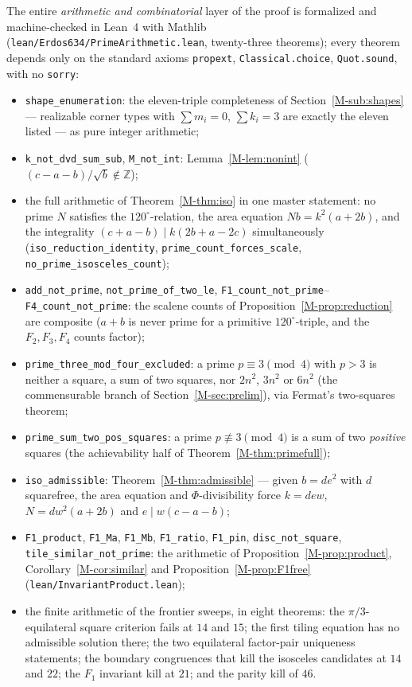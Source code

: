 \documentclass[11pt,reqno]{amsart}
\theoremstyle{plain}
\theoremstyle{definition}
\newcommand{\Z}{\mathbb{Z}}
\begin{document}
The entire \emph{arithmetic and combinatorial} layer of the proof is formalized and machine-checked
in Lean~4 with Mathlib (\texttt{lean/Erdos634/PrimeArithmetic.lean}, twenty-three theorems); every theorem depends only
on the standard axioms \texttt{propext}, \texttt{Classical.choice}, \texttt{Quot.sound}, with no
\texttt{sorry}:
\begin{itemize}
\item[] \texttt{shape\_enumeration}: the eleven-triple completeness of Section~\ref{M-sub:shapes} ---
realizable corner types with $\sum m_i=0$, $\sum k_i=3$ are exactly the eleven listed --- as pure
integer arithmetic;
\item[] \texttt{k\_not\_dvd\_sum\_sub}, \texttt{M\_not\_int}: Lemma~\ref{M-lem:nonint}
($(c-a-b)/\sqrt b\notin\Z$);
\item[] the full arithmetic of Theorem~\ref{M-thm:iso} in one master statement: no prime $N$
satisfies the $120^\circ$-relation, the area equation $Nb=k^2(a+2b)$, and the integrality
$(c+a-b)\mid k(2b+a-2c)$ simultaneously (\texttt{iso\_reduction\_identity},
\texttt{prime\_count\_forces\_scale}, \texttt{no\_prime\_isosceles\_count});
\item[] \texttt{add\_not\_prime}, \texttt{not\_prime\_of\_two\_le},
\texttt{F1\_count\_not\_prime}--\texttt{F4\_count\_not\_prime}: the scalene counts of
Proposition~\ref{M-prop:reduction} are composite ($a+b$ is never prime for a primitive
$120^\circ$-triple, and the $F_2,F_3,F_4$ counts factor);
\item[] \texttt{prime\_three\_mod\_four\_excluded}: a prime $p\equiv3\pmod4$ with $p>3$ is
neither a square, a sum of two squares, nor $2n^2$, $3n^2$ or $6n^2$ (the commensurable branch of
Section~\ref{M-sec:prelim}), via Fermat's two-squares theorem;
\item[] \texttt{prime\_sum\_two\_pos\_squares}: a prime $p\not\equiv3\pmod4$ is a sum of two
\emph{positive} squares (the achievability half of Theorem~\ref{M-thm:primefull});
\item[] \texttt{iso\_admissible}: Theorem~\ref{M-thm:admissible} --- given $b=de^2$ with $d$
squarefree, the area equation and $\Phi$-divisibility force $k=dew$, $N=dw^2(a+2b)$ and
$e\mid w(c-a-b)$;
\item[] \texttt{F1\_product}, \texttt{F1\_Ma}, \texttt{F1\_Mb}, \texttt{F1\_ratio},
\texttt{F1\_pin}, \texttt{disc\_not\_square}, \texttt{tile\_similar\_not\_prime}: the arithmetic of
Proposition~\ref{M-prop:product}, Corollary~\ref{M-cor:similar} and Proposition~\ref{M-prop:F1free}
(\texttt{lean/InvariantProduct.lean});
\item[] the finite arithmetic of the frontier sweeps, in eight theorems: the
$\pi/3$-equilateral square criterion fails at $14$ and $15$; the first tiling equation has no
admissible solution there; the two equilateral factor-pair uniqueness statements; the boundary
congruences that kill the isosceles candidates at $14$ and $22$; the $F_1$ invariant kill at
$21$; and the parity kill of $46$.
\end{itemize}
\end{document}
